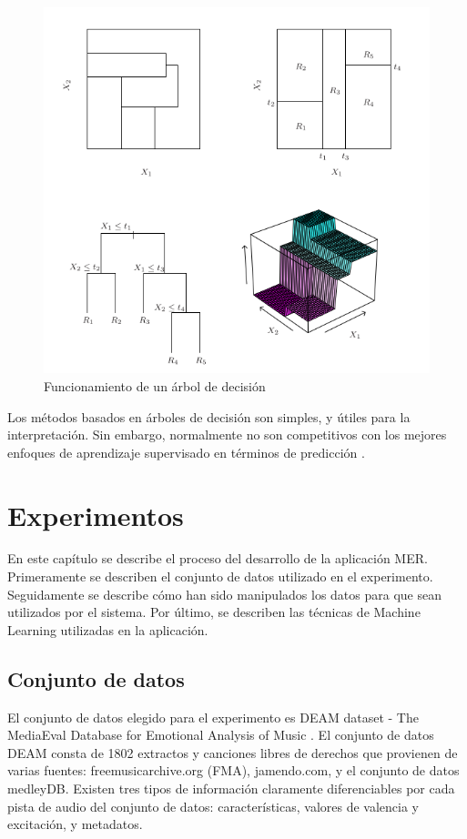 \documentclass[12pt,a4paper,Spanish]{article}
\begin{document}
\begin{figure}[H]
	\centering
	\includegraphics[width=0.7\linewidth]{figs/decission_tree}
	\caption{Funcionamiento de un árbol de decisión}
	\label{fig:decissiontree}
\end{figure}


Los métodos basados en árboles de decisión son simples, y útiles para la interpretación. Sin embargo, normalmente no son competitivos con los mejores enfoques de aprendizaje supervisado en términos de predicción \cite{gareth2013introduction}.







\newpage
\section{Experimentos}
En este capítulo se describe el proceso del desarrollo de la aplicación MER. Primeramente se describen el conjunto de datos utilizado en el experimento. Seguidamente se describe cómo han sido manipulados los datos para que sean utilizados por el sistema. Por último, se describen las técnicas de Machine Learning utilizadas en la aplicación.
\subsection{Conjunto de datos}
El conjunto de datos elegido para el experimento es DEAM dataset - The MediaEval Database for Emotional Analysis of Music \cite{AlajankiEmoInMusicAnalysis}. El conjunto de datos DEAM consta de 1802 extractos y canciones libres de derechos que provienen de varias fuentes: freemusicarchive.org (FMA), jamendo.com,
y el conjunto de datos medleyDB.
\newline
Existen tres tipos de información claramente diferenciables por cada pista de audio del conjunto de datos: características, valores de valencia y excitación, y metadatos.
\end{document}
